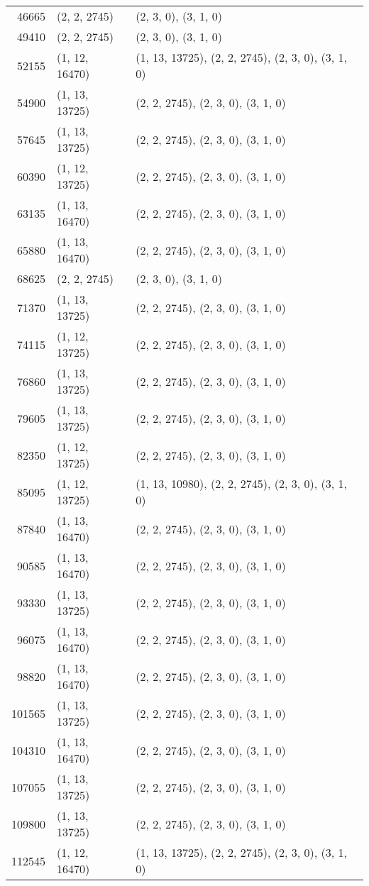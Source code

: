 \begin{table}
\begin{tabular}{r l l}
46665 & (2, 2, 2745) & (2, 3, 0), (3, 1, 0) \\
49410 & (2, 2, 2745) & (2, 3, 0), (3, 1, 0) \\
52155 & (1, 12, 16470) & (1, 13, 13725), (2, 2, 2745), (2, 3, 0), (3, 1, 0) \\
54900 & (1, 13, 13725) & (2, 2, 2745), (2, 3, 0), (3, 1, 0) \\
57645 & (1, 13, 13725) & (2, 2, 2745), (2, 3, 0), (3, 1, 0) \\
60390 & (1, 12, 13725) & (2, 2, 2745), (2, 3, 0), (3, 1, 0) \\
63135 & (1, 13, 16470) & (2, 2, 2745), (2, 3, 0), (3, 1, 0) \\
65880 & (1, 13, 16470) & (2, 2, 2745), (2, 3, 0), (3, 1, 0) \\
68625 & (2, 2, 2745) & (2, 3, 0), (3, 1, 0) \\
71370 & (1, 13, 13725) & (2, 2, 2745), (2, 3, 0), (3, 1, 0) \\
74115 & (1, 12, 13725) & (2, 2, 2745), (2, 3, 0), (3, 1, 0) \\
76860 & (1, 13, 13725) & (2, 2, 2745), (2, 3, 0), (3, 1, 0) \\
79605 & (1, 13, 13725) & (2, 2, 2745), (2, 3, 0), (3, 1, 0) \\
82350 & (1, 12, 13725) & (2, 2, 2745), (2, 3, 0), (3, 1, 0) \\
85095 & (1, 12, 13725) & (1, 13, 10980), (2, 2, 2745), (2, 3, 0), (3, 1, 0) \\
87840 & (1, 13, 16470) & (2, 2, 2745), (2, 3, 0), (3, 1, 0) \\
90585 & (1, 13, 16470) & (2, 2, 2745), (2, 3, 0), (3, 1, 0) \\
93330 & (1, 13, 13725) & (2, 2, 2745), (2, 3, 0), (3, 1, 0) \\
96075 & (1, 13, 16470) & (2, 2, 2745), (2, 3, 0), (3, 1, 0) \\
98820 & (1, 13, 16470) & (2, 2, 2745), (2, 3, 0), (3, 1, 0) \\
101565 & (1, 13, 13725) & (2, 2, 2745), (2, 3, 0), (3, 1, 0) \\
104310 & (1, 13, 16470) & (2, 2, 2745), (2, 3, 0), (3, 1, 0) \\
107055 & (1, 13, 13725) & (2, 2, 2745), (2, 3, 0), (3, 1, 0) \\
109800 & (1, 13, 13725) & (2, 2, 2745), (2, 3, 0), (3, 1, 0) \\
112545 & (1, 12, 16470) & (1, 13, 13725), (2, 2, 2745), (2, 3, 0), (3, 1, 0) \\
\hline
\end{tabular}
\end{table}

